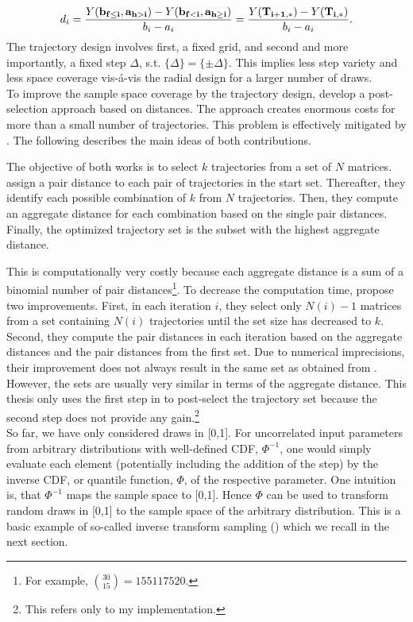 \begin{align} \label{eq:traj}
d_i =  \frac{Y(\bold{b_{f \leq i}}, \bold{a_{h>i}}) - Y(\bold{b_{f<i}}, \bold{a_{h \geq i}})}{b_i - a_i} = \frac{Y(\bold{T_{i+1,*})} -  Y(\bold{T_{i,*}})}{b_i - a_i}.
\end{align}
The trajectory design involves first, a fixed grid, and second and more importantly, a fixed step $\Delta$, s.t. $\{\Delta\} = \{\pm \Delta\}$. This implies less step variety and less space coverage vis-á-vis the radial design for a larger number of draws.\\

\noindent
To improve the sample space coverage by the trajectory design, \cite{campolongo2007effective} develop a post-selection approach based on distances. The approach creates enormous costs for more than a small number of trajectories. This problem is effectively mitigated by \cite{ge2014efficient}. The following describes the main ideas of both contributions.

The objective of both works is to select $k$ trajectories from a set of $N$ matrices. \cite{campolongo2007effective} assign a pair distance to each pair of trajectories in the start set. Thereafter, they identify each possible combination of $k$ from $N$ trajectories. Then, they compute an aggregate distance for each combination based on the single pair distances. Finally, the optimized trajectory set is the subset with the highest aggregate distance.

This is computationally very costly because each aggregate distance is a sum of a binomial number of pair distances\footnote{For example, $\binom{30}{15} = 155117520$.}. To decrease the computation time, \cite{ge2014efficient} propose two improvements. First, in each iteration $i$, they select only $N(i)-1$ matrices from a set containing $N(i)$ trajectories until the set size has decreased to $k$. Second, they compute the pair distances in each iteration based on the aggregate distances and the pair distances from the first set. Due to numerical imprecisions, their improvement does not always result in the same set as obtained from \cite{campolongo2007effective}. However, the sets are usually very similar in terms of the aggregate distance. This thesis only uses the first step in \cite{ge2014efficient} to post-select the trajectory set because the second step does not provide any gain.\footnote{This refers only to my implementation.}\\


\noindent
So far, we have only considered draws in [0,1]. For uncorrelated input parameters from arbitrary distributions with well-defined CDF, $\Phi^{-1}$, one would simply evaluate each element (potentially including the addition of the step) by the inverse CDF, or quantile function, $\Phi$, of the respective parameter. One intuition is, that $\Phi^{-1}$ maps the sample space to [0,1]. Hence $\Phi$ can be used to transform random draws in [0,1] to the sample space of the arbitrary distribution. This is a basic example of so-called inverse transform sampling (\cite{devroye1986sample}) which we recall in the next section.



